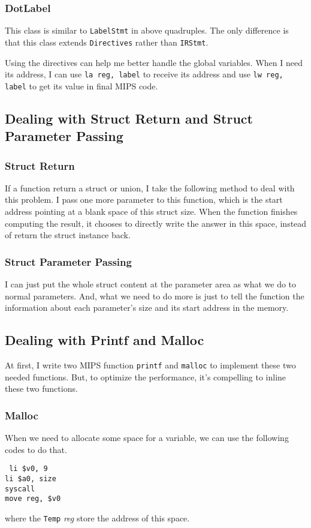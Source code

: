 \documentclass[journal]{IEEEtran}
\begin{document}
\subsubsection{DotLabel}
This class is similar to \texttt{LabelStmt} in above quadruples. The only difference is that this class extends \texttt{Directives} rather than \texttt{IRStmt}.

Using the directives can help me better handle the global variables. When I need its address, I can use \texttt{la reg, label} to receive its address and use \texttt{lw reg, label} to get its value in final MIPS code.

\subsection{Dealing with Struct Return and Struct Parameter Passing}

\subsubsection{Struct Return}
If a function return a struct or union, I take the following method to deal with this problem. I pass one more parameter to this function, which is the start address pointing at a blank space of this struct size. When the function finishes computing the result, it chooses to directly write the answer in this space, instead of return the struct instance back.

\subsubsection{Struct Parameter Passing}
I can just put the whole struct content at the parameter area as what we do to normal parameters. And, what we need to do more is just to tell the function the information about each parameter's size and its start address in the memory.

\subsection{Dealing with Printf and Malloc}

At first, I write two MIPS function \texttt{printf} and \texttt{malloc} to implement these two needed functions. But, to optimize the performance, it's compelling to inline these two functions. 

\subsubsection{Malloc}
When we need to allocate some space for a variable, we can use the following codes to do that.
\begin{center}
\texttt{
	li \$v0, 9  \ \ \  \ \ \ \ \\
	li \$a0, size \ \ \ \\
 	syscall  \ \ \  \ \ \ \ \ \\
	move reg, \$v0 \ \ \\
}
\end{center}
where the \texttt{Temp} \textit{reg} store the address of this space.
\end{document}
